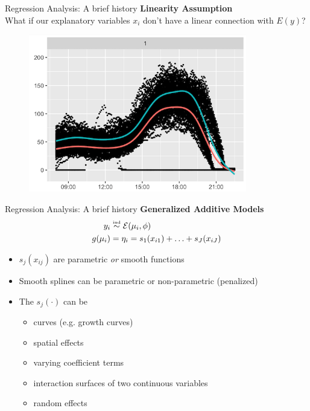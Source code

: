 \documentclass[t]{beamer} 	%
\begin{document}
\begin{frame}{Regression Analysis: A brief history}
	\textbf{Linearity Assumption} \\
	What if our explanatory variables $x_i$ don't have a linear connection with $E(y)$?
	\begin{figure}
		\centering
		\includegraphics[width=0.85\textwidth, clip, trim = {0cm 0cm 0cm 0.5cm}]{images/nonlinearity.png}
	\end{figure}
\end{frame}

\begin{frame}{Regression Analysis: A brief history}
	\textbf{Generalized Additive Models} \\
	\citet{tibshirani1986}
	\begin{align*}
		y_i&\stackrel{\hbox{\tiny{ind}}}{\sim} \mathcal{E}(\mu_i,\phi)\\
		g(\mu_i)&=\eta_i= s_1(x_{i1})+\ldots+s_J(x_{iJ})
		\end{align*}
		\begin{itemize}
		\item $s_j(x_{ij})$ are parametric \textit{or} smooth functions
		\item Smooth splines can be parametric or non-parametric (penalized)
		\item The $s_j(\cdot)$ can be
			\begin{itemize}
				\item curves (e.g. growth curves)
				\item spatial effects 
				\item varying coefficient terms
				\item interaction surfaces of two continuous variables
				\item random effects
			\end{itemize}
		\end{itemize}
\end{frame}
\end{document}

